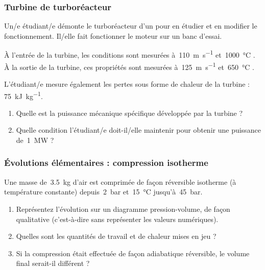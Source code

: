 \onlyframabook{\vspace{-1em}}	
\onlyamphibook{\par~\clearfloats\dontbreakpage}%
\subsubsection{Turbine de turboréacteur}
\label{exo_gp_turbine_turboreacteur}
\wherefrom{[DS n°2 2011, 3pts]}
	
	Un/e étudiant/e démonte le turboréacteur \textit{} d’un  pour en étudier et en modifier le fonctionnement. Il/elle fait fonctionner le moteur sur un banc d’essai.
	
	À l’entrée de la turbine, les conditions sont mesurées à~\SI{110}{\metre\per\second} et~\SI{1000 }{\degreeCelsius} .\\
	À la sortie de la turbine, ces propriétés sont mesurées à~\SI{125}{\metre\per\second} et~\SI{650}{\degreeCelsius} .
	
	L’étudiant/e mesure également les pertes sous forme de chaleur de la turbine : \SI{75}{\kilo\joule\per\kilogram}.
	
	\begin{enumerate}
		\item Quelle est la puissance mécanique spécifique développée par la turbine ?
		\item Quelle condition l’étudiant/e doit-il/elle maintenir pour obtenir une puissance de~\SI{1}{\mega\watt} ?
	\end{enumerate}


\subsubsection{Évolutions élémentaires : compression isotherme}
\label{exo_gp_isotherme}
\wherefrom{[DS n°2 2011, 4pts]}

	Une masse de~\SI{3,5}{\kilogram} d’air est comprimée de façon réversible isotherme (à température constante) depuis~\SI{2}{\bar} et~\SI{15}{\degreeCelsius} jusqu’à~\SI{45}{\bar}.
	
	\begin{enumerate}
		\item Représentez l’évolution sur un diagramme pression-volume, de façon qualitative (c’est-à-dire sans représenter les valeurs numériques).
		\item Quelles sont les quantités de travail et de chaleur mises en jeu ?
		\item Si la compression était effectuée de façon adiabatique réversible, le volume final serait-il différent ?
	\end{enumerate}
	

